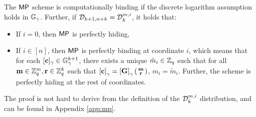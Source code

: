 \begin{theorem} \label{theo:mp} The $\mathsf{MP}$ scheme is computationally binding if  the discrete logarithm assumption holds in $\mathbb{G}_\gamma$. Further, if 
$\mathcal{D}_{k+1,n+k}=\mathcal{D}_k^{m,i}$, it holds that: 
\begin{itemize}
\item If $i=0$,  then $\mathsf{MP}$ is perfectly hiding,
\item If $i \in [n]$, then $\mathsf{MP}$ is perfectly binding at coordinate $i$, which means that for each $[\mathbf{c}]_\gamma \in \mathbb{G}_{\gamma}^{k+1}$,
there exists a unique $\tilde{m}_i \in\mathbb{Z}_q$ such that for all $\mathbf{m} \in\mathbb{Z}_q^m, \mathbf{r} \in\mathbb{Z}_q^{k}$ such that  $\left[\mathbf{c}\right]_{\gamma}=\left[\mathbf{{G}}\right]_{\gamma}\left(\begin{smallmatrix}\mathbf{m}\\\mathbf{r}\end{smallmatrix}\right)$, $m_i=\tilde{m}_i$. Further, the scheme is perfectly hiding at the rest of coordinates. 
\end{itemize}
\end{theorem}
The proof is not hard to derive from the definition of the $\mathcal{D}_k^{m,i}$ distribution, and can be found in Appendix \ref{app:mp}. 


